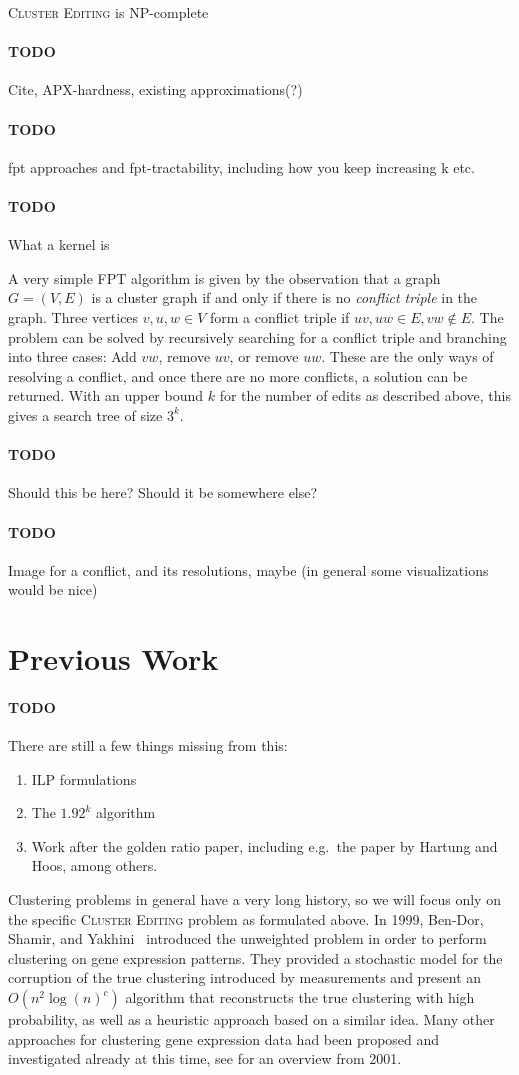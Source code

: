 \documentclass{article}
\newcommand{\todo}[1]{\paragraph{TODO} #1}
\theoremstyle{definition}
\begin{document}
\textsc{Cluster Editing} is NP-complete
\todo Cite, APX-hardness, existing approximations(?)

\todo fpt approaches and fpt-tractability, including how you keep increasing k etc.
\todo What a kernel is

A very simple FPT algorithm is given by the observation that a graph $G = (V, E)$ is a cluster graph
if and only if there is no \emph{conflict triple} in the graph. Three vertices $v, u, w \in V$ form
a conflict triple if $uv, uw \in E, vw \notin E$. The problem can be solved by recursively searching
for a conflict triple and branching into three cases: Add $vw$, remove $uv$, or remove $uw$. These
are the only ways of resolving a conflict, and once there are no more conflicts, a solution can be
returned. With an upper bound $k$ for the number of edits as described above, this gives a search
tree of size $3^k$.

\todo Should this be here? Should it be somewhere else?

\todo Image for a conflict, and its resolutions, maybe (in general some visualizations would be
nice)


\section{Previous Work}

\todo There are still a few things missing from this: \begin{enumerate}
	\item ILP formulations
	\item The $1.92^k$ algorithm
	\item Work after the golden ratio paper, including e.g.\ the paper by Hartung and Hoos, among
		others.
\end{enumerate}


Clustering problems in general have a very long history, so we will focus only on the specific
\textsc{Cluster Editing} problem as formulated above. In 1999, Ben-Dor, Shamir, and
Yakhini~\cite{BenDor} introduced the unweighted problem in order to perform clustering on gene
expression patterns. They provided a stochastic model for the corruption of the true clustering
introduced by measurements and present an $O(n^2 \log(n)^c)$ algorithm that reconstructs the true
clustering with high probability, as well as a heuristic approach based on a similar idea. Many
other approaches for clustering gene expression data had been proposed and investigated already at
this time, see \cite{ShamirOverview} for an overview from 2001.
\end{document}
